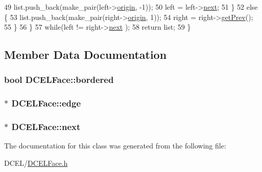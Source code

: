 \begin{DoxyCode}
49             list.push\_back(make\_pair(left->\hyperlink{classDCELHalfEdge_a43a9bcc720748208b21efda5b2013c3c}{origin}, -1));
50             left = left->\hyperlink{classDCELHalfEdge_a7a2d43817186337439468eb238c6bce2}{next};
51         \}
52         \textcolor{keywordflow}{else} \{
53             list.push\_back(make\_pair(right->\hyperlink{classDCELHalfEdge_a43a9bcc720748208b21efda5b2013c3c}{origin}, 1));
54             right = right->\hyperlink{classDCELHalfEdge_ab6d676209796f1a885656f0ed54d5399}{getPrev}();
55         \}
56     \}
57     \textcolor{keywordflow}{while}(left != right->\hyperlink{classDCELHalfEdge_a7a2d43817186337439468eb238c6bce2}{next} );
58     \textcolor{keywordflow}{return} list;
59 \}\end{DoxyCode}


\subsection{Member Data Documentation}
\subsubsection[{\texorpdfstring{bordered}{bordered}}]{\setlength{\rightskip}{0pt plus 5cm}bool D\+C\+E\+L\+Face\+::bordered}\hypertarget{classDCELFace_a9b4085ea85f8aee290233e0e9ac1f605}{}\label{classDCELFace_a9b4085ea85f8aee290233e0e9ac1f605}
\subsubsection[{\texorpdfstring{edge}{edge}}]{$\ast$ D\+C\+E\+L\+Face\+::edge}\hypertarget{classDCELFace_a1a6ec913fa7adbe1bfbad64b99ffe6c5}{}\label{classDCELFace_a1a6ec913fa7adbe1bfbad64b99ffe6c5}
\subsubsection[{\texorpdfstring{next}{next}}]{$\ast$ D\+C\+E\+L\+Face\+::next}\hypertarget{classDCELFace_a5fd804213fb2d96f900442da49ccb137}{}\label{classDCELFace_a5fd804213fb2d96f900442da49ccb137}


The documentation for this class was generated from the following file\+:\begin{DoxyCompactItemize}
\item 
D\+C\+E\+L/\hyperlink{DCELFace_8h}{D\+C\+E\+L\+Face.\+h}\end{DoxyCompactItemize}
